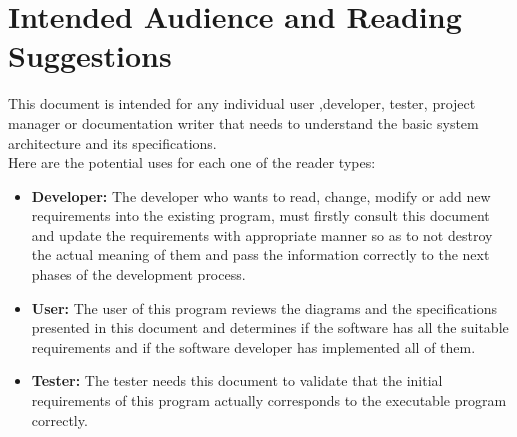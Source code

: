 \documentclass{scrreprt}
\begin{document}
 \section{Intended Audience and Reading Suggestions}
This document is intended for any individual user ,developer, tester, project manager or
documentation writer that needs to understand the basic system architecture and its specifications.\\
Here are the potential uses for each one of the reader types:\\
\begin{itemize}
\item \textbf{Developer: }The developer who wants to read, change, modify or add new requirements into
the existing program, must firstly consult this document and update the requirements with
appropriate manner so as to not destroy the actual meaning of them and pass the information
correctly to the next phases of the development process.\\
\item \textbf{User: }The user of this program reviews the diagrams and the specifications presented in this
document and determines if the software has all the suitable requirements and if the software
developer has implemented all of them.\\
\item \textbf{Tester: }The tester needs this document to validate that the initial requirements of this
program actually corresponds to the executable program correctly.\\
\end{itemize}
\end{document}
